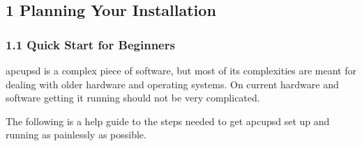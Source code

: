 \label{index-User_0027s-Guide-4}

\label{Planning-Your-Installation}

\subsection*{1 Planning Your Installation}

\label{index-Planning-Installation-5}
\label{index-Installation_002c-Planning-6}

\label{Quick-Start-for-Beginners}

\subsubsection*{1.1 Quick Start for Beginners}

\label{index-Quick-Start-7}
apcupsd is a complex piece of software, but most of its complexities are meant
for dealing with older hardware and operating systems.  On current hardware
and software getting it running should not be very complicated.  

The following is a help guide to the steps needed to get apcupsd set up and
running as painlessly as possible.  

